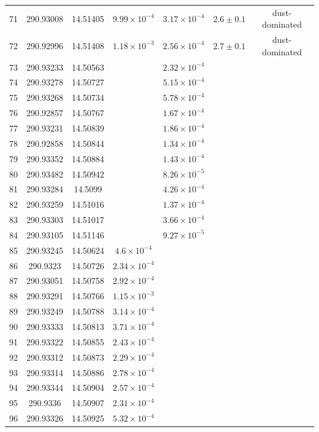 \begin{table}
\begin{tabular}{ccccccc}
71 & 290.93008 & 14.51405 & $9.99\times10^{-4}$ & $3.17\times10^{-4}$ & $2.6\pm0.1$ & dust-dominated \\
72 & 290.92996 & 14.51408 & $1.18\times10^{-3}$ & $2.56\times10^{-4}$ & $2.7\pm0.1$ & dust-dominated \\
73 & 290.93233 & 14.50563 &  & $2.32\times10^{-4}$ &  &  \\
74 & 290.93278 & 14.50727 &  & $5.15\times10^{-4}$ &  &  \\
75 & 290.93268 & 14.50734 &  & $5.78\times10^{-4}$ &  &  \\
76 & 290.92857 & 14.50767 &  & $1.67\times10^{-4}$ &  &  \\
77 & 290.93231 & 14.50839 &  & $1.86\times10^{-4}$ &  &  \\
78 & 290.92858 & 14.50844 &  & $1.34\times10^{-4}$ &  &  \\
79 & 290.93352 & 14.50884 &  & $1.43\times10^{-4}$ &  &  \\
80 & 290.93482 & 14.50942 &  & $8.26\times10^{-5}$ &  &  \\
81 & 290.93284 & 14.5099 &  & $4.26\times10^{-4}$ &  &  \\
82 & 290.93259 & 14.51016 &  & $1.37\times10^{-4}$ &  &  \\
83 & 290.93303 & 14.51017 &  & $3.66\times10^{-4}$ &  &  \\
84 & 290.93105 & 14.51146 &  & $9.27\times10^{-5}$ &  &  \\
85 & 290.93245 & 14.50624 & $4.6\times10^{-4}$ &  &  &  \\
86 & 290.9323 & 14.50726 & $2.34\times10^{-4}$ &  &  &  \\
87 & 290.93051 & 14.50758 & $2.92\times10^{-4}$ &  &  &  \\
88 & 290.93291 & 14.50766 & $1.15\times10^{-3}$ &  &  &  \\
89 & 290.93249 & 14.50788 & $3.14\times10^{-4}$ &  &  &  \\
90 & 290.93333 & 14.50813 & $3.71\times10^{-4}$ &  &  &  \\
91 & 290.93322 & 14.50855 & $2.43\times10^{-4}$ &  &  &  \\
92 & 290.93312 & 14.50873 & $2.29\times10^{-4}$ &  &  &  \\
93 & 290.93314 & 14.50886 & $2.78\times10^{-4}$ &  &  &  \\
94 & 290.93344 & 14.50904 & $2.57\times10^{-4}$ &  &  &  \\
95 & 290.9336 & 14.50907 & $2.31\times10^{-4}$ &  &  &  \\
96 & 290.93326 & 14.50925 & $5.32\times10^{-4}$ &  &  &  \\

\end{tabular}
\end{table}

